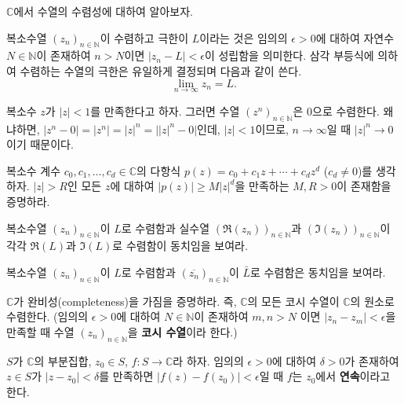 $\mathbb C$에서 수열의 수렴성에 대하여 알아보자.
 
복소수열 $(z_n)_{n\in\mathbb N}$이 수렴하고 극한이 $L$이라는 것은
임의의 $\epsilon>0$에 대하여 자연수 $N\in\mathbb N$이 존재하여
 $n>N$이면 $|z_n -L| < \epsilon$이 성립함을 의미한다.
삼각 부등식에 의하여 수렴하는 수열의 극한은 유일하게 결정되며
다음과 같이 쓴다.
$$
\lim_{n\to\infty} z_n = L.
$$

\begin{saltexample}[label=example-1-1]{}{}
복소수 $z$가 $|z|<1$를 만족한다고 하자.
그러면 수열 $(z^n)_{n\in\mathbb N}$은 $0$으로 수렴한다.
왜냐하면, $|z^n-0| = |z^n| = |z|^n = \big||z|^n-0\big|$인데,
$|z|<1$이므로, $n\to\infty$일 때 $|z|^n\to0$이기 때문이다.
\end{saltexample}

\begin{salt_exercise} \label{ex-1-24}
복소수 계수 $c_0, c_1, \ldots, c_d\in \mathbb C$의
다항식 $p(z)=c_0 + c_1z + \cdots + c_dz^d$ ($c_d\ne0$)를 생각하자.
$|z|>R$인 모든 $z$에 대하여 $|p(z)| \ge M|z|^d$을 만족하는
$M, R>0$이 존재함을 증명하라.
\end{salt_exercise}

\begin{salt_exercise} \label{ex-1-25}
복소수열 $(z_n)_{n\in\mathbb N}$이 $L$로 수렴함과
실수열 $(\Re(z_n))_{n\in\mathbb N}$과  $(\Im(z_n))_{n\in\mathbb N}$이
각각 $\Re(L)$과 $\Im(L)$로 수렴함이 동치임을 보여라.
\end{salt_exercise}

\begin{salt_exercise} \label{ex-1-26}
복소수열 $(z_n)_{n\in\mathbb N}$이 $L$로 수렴함과
$(\overline{z_n})_{n\in\mathbb N}$이 $\bar L$로 수렴함은 동치임을 보여라.
\end{salt_exercise}

\begin{salt_exercise} \label{ex-1-27}
$\mathbb C$가 완비성(completeness)을 가짐을 증명하라.
즉, $\mathbb C$의 모든 코시 수열이 $\mathbb C$의 원소로 수렴한다.
(임의의 $\epsilon>0$에 대하여  $N\in\mathbb N$이 존재하여
$m,n>N$ 이면 $|z_n - z_m| < \epsilon$을 만족할 때
수열 $(z_n)_{n\in\mathbb N}$을 {\bf 코시 수열}이라 한다.)
\end{salt_exercise}

$S$가 $\mathbb C$의 부분집합, $z_0\in S$,  $f:S\to \mathbb C$라 하자.
임의의 $\epsilon>0$에 대하여 $\delta>0$가 존재하여
$z\in S$가 $|z-z_0|<\delta$를 만족하면 $|f(z)-f(z_0)|<\epsilon$일 때
$f$는 $z_0$에서 {\bf 연속}이라고 한다.

